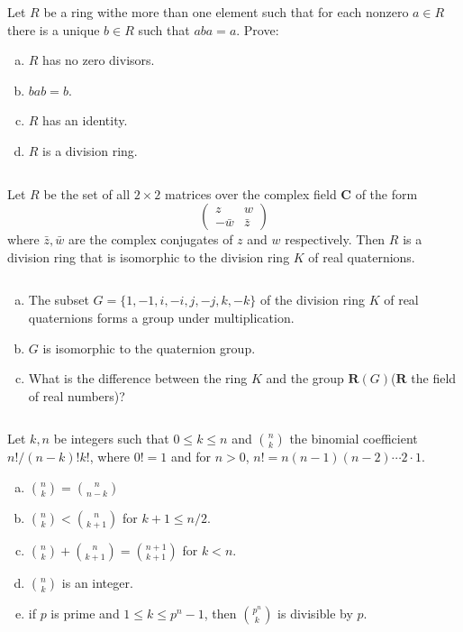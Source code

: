 $$ $$

\begin{ex}
    Let $R$ be a ring withe more than one element such that for each nonzero $a\in R$ there is a unique $b\in R$ such that $aba=a$. Prove:
    \begin{enumerate}[(a)]
        \item $R$ has no zero divisors.
        \item $bab=b$.
        \item $R$ has an identity.
        \item $R$ is a division ring.
    \end{enumerate}
\end{ex}

$$ $$

\begin{ex}
    Let $R$ be the set of all $2\times 2$ matrices over the complex field $\mathbf{C}$ of the form \[\begin{pmatrix}
        z& w\\ -\bar{w}&\bar{z}
    \end{pmatrix}\]where $\bar{z}, \bar{w}$ are the complex conjugates of $z$ and $w$ respectively. Then $R$ is a division ring that is isomorphic to the division ring $K$ of real quaternions.
\end{ex}

$$ $$

\begin{ex}
    \begin{enumerate}[(a)]
        \item The subset $G=\{1,-1, i, -i, j, -j, k, -k\}$ of the division ring $K$ of real quaternions forms a group under multiplication.
        \item $G$ is isomorphic to the quaternion group.
        \item What is the difference between the ring $K$ and the group $\mathbf{R}(G)$($\mathbf{R}$ the field of real numbers)?
    \end{enumerate}
\end{ex}

$$ $$

\begin{ex}
    Let $k, n$ be integers such that $0\leq k\leq n$ and $\binom{n}{k}$ the binomial coefficient $n! /(n-k)!k!$, where $0! =1$ and for $n>0$, $n!=n(n-1)(n-2)\cdots 2\cdot 1$.
    \begin{enumerate}[(a)]
        \item $\binom{n}{k}=\binom{n}{n-k}$
        \item $\binom{n}{k}<\binom{n}{k+1}$ for $k+1\leq n /2$.
        \item $\binom{n}{k}+\binom{n}{k+1}=\binom{n+1}{k+1}$ for $k<n$.
        \item $\binom{n}{k}$ is an integer.
        \item if $p$ is prime and $1\leq k\leq p^{n}-1$, then $\binom{p^{n}}{k}$ is divisible by $p$.
    \end{enumerate}
\end{ex}

